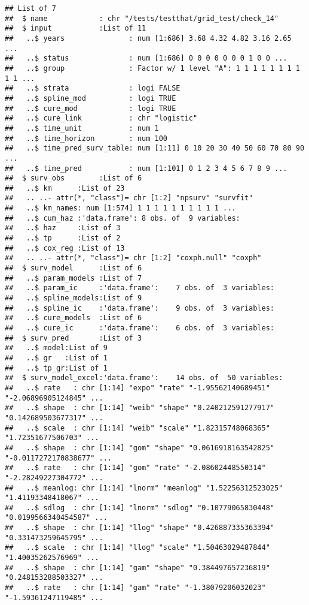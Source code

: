 \documentclass[
]{article}
\begin{document}
\begin{verbatim}
## List of 7
##  $ name            : chr "/tests/testthat/grid_test/check_14"
##  $ input           :List of 11
##   ..$ years               : num [1:686] 3.68 4.32 4.82 3.16 2.65 ...
##   ..$ status              : num [1:686] 0 0 0 0 0 0 0 1 0 0 ...
##   ..$ group               : Factor w/ 1 level "A": 1 1 1 1 1 1 1 1 1 1 ...
##   ..$ strata              : logi FALSE
##   ..$ spline_mod          : logi TRUE
##   ..$ cure_mod            : logi TRUE
##   ..$ cure_link           : chr "logistic"
##   ..$ time_unit           : num 1
##   ..$ time_horizon        : num 100
##   ..$ time_pred_surv_table: num [1:11] 0 10 20 30 40 50 60 70 80 90 ...
##   ..$ time_pred           : num [1:101] 0 1 2 3 4 5 6 7 8 9 ...
##  $ surv_obs        :List of 6
##   ..$ km      :List of 23
##   .. ..- attr(*, "class")= chr [1:2] "npsurv" "survfit"
##   ..$ km_names: num [1:574] 1 1 1 1 1 1 1 1 1 1 ...
##   ..$ cum_haz :'data.frame': 8 obs. of  9 variables:
##   ..$ haz     :List of 3
##   ..$ tp      :List of 2
##   ..$ cox_reg :List of 13
##   .. ..- attr(*, "class")= chr [1:2] "coxph.null" "coxph"
##  $ surv_model      :List of 6
##   ..$ param_models :List of 7
##   ..$ param_ic     :'data.frame':    7 obs. of  3 variables:
##   ..$ spline_models:List of 9
##   ..$ spline_ic    :'data.frame':    9 obs. of  3 variables:
##   ..$ cure_models  :List of 6
##   ..$ cure_ic      :'data.frame':    6 obs. of  3 variables:
##  $ surv_pred       :List of 3
##   ..$ model:List of 9
##   ..$ gr   :List of 1
##   ..$ tp_gr:List of 1
##  $ surv_model_excel:'data.frame':    14 obs. of  50 variables:
##   ..$ rate   : chr [1:14] "expo" "rate" "-1.95562140689451" "-2.06896905124845" ...
##   ..$ shape  : chr [1:14] "weib" "shape" "0.240212591277917" "0.142689503677317" ...
##   ..$ scale  : chr [1:14] "weib" "scale" "1.82315748068365" "1.72351677506703" ...
##   ..$ shape  : chr [1:14] "gom" "shape" "0.0616918163542825" "-0.0117272170838677" ...
##   ..$ rate   : chr [1:14] "gom" "rate" "-2.08602448550314" "-2.28249227304772" ...
##   ..$ meanlog: chr [1:14] "lnorm" "meanlog" "1.52256312523025" "1.41193348418067" ...
##   ..$ sdlog  : chr [1:14] "lnorm" "sdlog" "0.10779065830448" "0.0199566340454587" ...
##   ..$ shape  : chr [1:14] "llog" "shape" "0.426887335363394" "0.331473259645795" ...
##   ..$ scale  : chr [1:14] "llog" "scale" "1.50463029487844" "1.40035262576969" ...
##   ..$ shape  : chr [1:14] "gam" "shape" "0.384497657236819" "0.248153288503327" ...
##   ..$ rate   : chr [1:14] "gam" "rate" "-1.38079206032023" "-1.59361247119485" ...

\end{verbatim}
\end{document}
